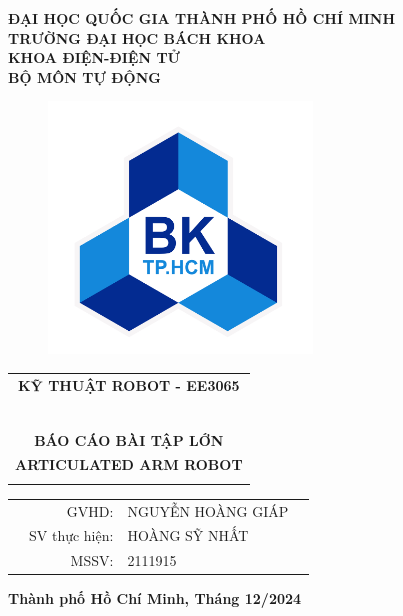 \documentclass[a4paper]{article}
\begin{document}
\large
\begin{titlepage}
\begin{center}
\textbf{\large ĐẠI HỌC QUỐC GIA THÀNH PHỐ HỒ CHÍ MINH} \\
\textbf{\large TRƯỜNG ĐẠI HỌC BÁCH KHOA} \\
\textbf{\large KHOA ĐIỆN-ĐIỆN TỬ} \\
\textbf{\large BỘ MÔN TỰ ĐỘNG} 
\end{center}
\begin{figure}[h!]
\begin{center}
\includegraphics[width=7cm]{Images/hcmut.png}
\end{center}
\end{figure}

\vspace{1cm}
\begin{center}
\begin{tabular}{c}
{\textbf{{\Large KỸ THUẬT ROBOT - EE3065}}}\\
~~\\
\hline
\\
\textbf{\large BÁO CÁO BÀI TẬP LỚN} \\
\textbf{\LARGE ARTICULATED ARM ROBOT} \\
\\
\hline
\end{tabular}
\end{center}

\vspace{1cm}

\begin{table}[h]
\begin{tabular}{rrlr}
\hspace{5 cm} & \large GVHD: & \large NGUYỄN HOÀNG GIÁP\\

& \large SV thực hiện: & \large HOÀNG SỸ NHẤT \\
& \large MSSV: & \large 2111915 \\

\end{tabular}
\end{table}
\vspace{2cm}
\begin{center}
{\bf Thành phố Hồ Chí Minh, Tháng 12/2024}
\end{center}
\end{titlepage}
\end{document}
